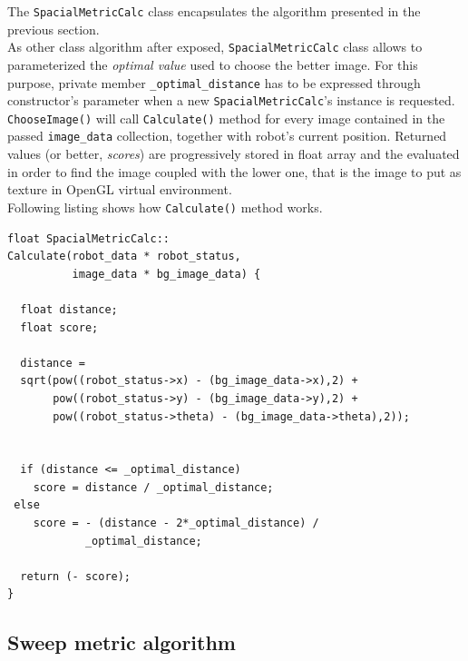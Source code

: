 The \texttt{SpacialMetricCalc} class encapsulates the 
algorithm presented in the previous section.
\\
As other class algorithm after exposed, \texttt{SpacialMetricCalc}
class allows to parameterized the \textit{optimal value} used to
choose the better image. For this purpose, private member
\texttt{\_optimal\_distance} has to be expressed through constructor's
parameter when a new \texttt{SpacialMetricCalc}'s instance
is requested.
\texttt{ChooseImage()} will call \texttt{Calculate()}
method for every image contained in the passed \texttt{image\_data}
collection, together with robot's current position.
Returned values (or better, \textit{scores}) are
progressively stored in float array and the evaluated in order
to find the image coupled with the lower one, that is the image
to put as texture in OpenGL virtual environment.
\\
Following listing shows how \texttt{Calculate()} method works.
\\
\begin{lstlisting}[caption={\texttt{SpacialMetricCalc::Calculate} method},
    label={code:spacialmetriccalc:calculate}]
float SpacialMetricCalc::
Calculate(robot_data * robot_status,
          image_data * bg_image_data) {

  float distance;
  float score;

  distance = 
  sqrt(pow((robot_status->x) - (bg_image_data->x),2) +
       pow((robot_status->y) - (bg_image_data->y),2) +
       pow((robot_status->theta) - (bg_image_data->theta),2));


  if (distance <= _optimal_distance)
    score = distance / _optimal_distance;
 else
    score = - (distance - 2*_optimal_distance) /
            _optimal_distance;

  return (- score);
}
\end{lstlisting}


\subsection{Sweep metric algorithm}
\label{concr:iimageselector:sweep_metric_algorithm}

